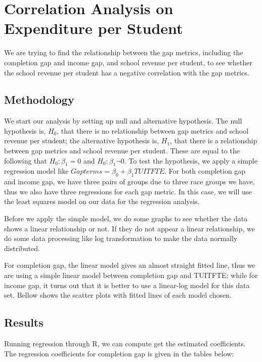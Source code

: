 \documentclass{article}
\begin{document}

\section{Correlation Analysis on Expenditure per Student}

We are trying to find the relationship between the gap metrics, including the completion gap and income gap,  and school revenue per student, to see whether the school revenue per student has a negative correlation with the gap metrics. 

\subsection{Methodology}

We start our analysis by setting up null and alternative hypothesis. The null hypothesis is, $H_{0}$, that there is no relationship between gap metrics and school revenue per student; the alternative hypothesis is, $H_{1}$, that there is a relationship between gap metrics and school revenue per student. These are equal to the following that $H_{0}: \beta_1 = 0$ and $H_{0}: \beta_1 \neg 0$. To test the hypothesis, we apply a simple regression model like $Gapterms= \beta_0 + \beta_1 TUITFTE$. For both completion gap and income gap, we have three pairs of groups due to three race groups we have, thus we also have three regressions for each gap metric. In this case, we will use the least squares model on our data for the regression analysis. 

Before we apply the simple model, we do some graphs to see whether the data shows a linear relationship or not. If they do not appear a linear relationship, we do some data processing like log transformation to make the data normally distributed. 

For completion gap, the linear model gives an almost straight fitted line, thus we are using a simple linear model between completion gap and TUITFTE; while for income gap, it turns out that it is better to use a linear-log model for this data set. Bellow shows the scatter plots with fitted lines of each model chosen.


\subsection{Results}

Running regression through R, we can compute get the estimated coefficients. The regression coefficients for completion gap is given in the tables below:
\end{document}
